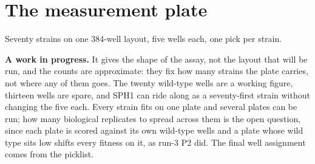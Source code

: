 
\section{The measurement plate}\label{sec:plate}

Seventy strains on one 384-well layout, five wells each, one pick per strain.

\textbf{A work in progress.} It gives the shape of the assay, not the layout that
will be run, and the counts are approximate: they fix how many strains the plate
carries, not where any of them goes. The twenty wild-type wells are a working
figure, thirteen wells are spare, and SPH1 can ride along as a seventy-first strain
without changing the five each. Every strain fits on one plate and several plates
can be run; how many biological replicates to spread across them is the open
question, since each plate is scored against its own wild-type wells and a plate
whose wild type sits low shifts every fitness on it, as run-3 P2 did. The final
well assignment comes from the picklist.


